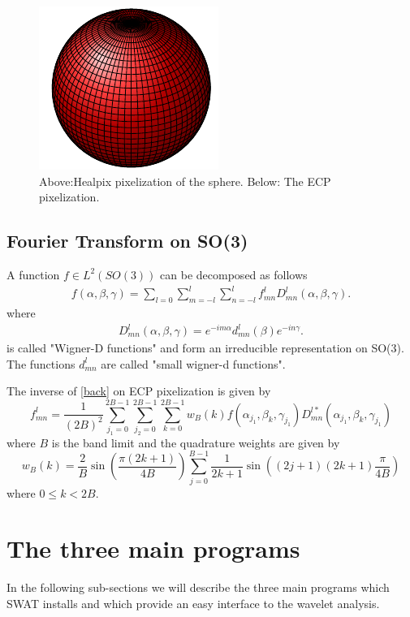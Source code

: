 \documentclass[12pt]{article}
\begin{document}
\begin{figure}[ht]
      \includegraphics[]{cylindrical-f3.pdf}
   \caption{Above:Healpix pixelization of the sphere. Below: The ECP pixelization.}
   \label{healpix}
\end{figure}

\subsection{Fourier Transform on SO(3)}
A function $f \in L^2(SO(3))$ can be decomposed as follows
\begin{eqnarray}
f(\alpha,\beta,\gamma) = \sum_{l = 0}\sum_{m = -l}^l\sum_{n = -l}^l f^l_{mn}D^l_{mn}(\alpha,\beta,\gamma).
\label{back}
\end{eqnarray}
where
\begin{eqnarray}
D^l_{mn}(\alpha,\beta,\gamma) = e^{-im\alpha}d^l_{mn}(\beta)e^{-in\gamma}.
\end{eqnarray}
is called "Wigner-D functions" and form an irreducible representation on SO(3). The
functions $d^l_{mn}$ are called "small wigner-d functions".

The inverse of \ref{back} on ECP pixelization is given by
\begin{equation}
f^l_{mn} = \frac{1}{(2B)^2}\sum_{j_1 = 0}^{2B - 1}\sum_{j_2 = 0}^{2B - 1}\sum_{k = 0}^{2B - 1}
w_B(k)f(\alpha_{j_1},\beta_{k},\gamma_{j_1})D^{l*}_{mn}(\alpha_{j_1},\beta_{k},\gamma_{j_1})
\end{equation}
where $B$ is the band limit and the quadrature weights are given by
\begin{equation}
w_B(k) = \frac{2}{B}\sin\left(\frac{\pi(2k + 1)}{4B}\right)\sum_{j = 0}^{B - 1}
\frac{1}{2k + 1}\sin\left((2j+1)(2k+1)\frac{\pi}{4B}\right)
\end{equation}
where $0\le k < 2B$. 

\section{The three main programs}
In the following sub-sections we will describe the three main programs which 
SWAT installs and which provide an easy interface to the wavelet analysis.
\end{document}
